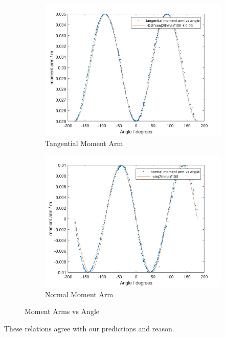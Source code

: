 \documentclass{article}
\begin{document}
\begin{figure}[ht]
  \begin{subfigure}[b]{0.4\linewidth}
    \includegraphics[scale=0.14]{TanMomentArmVsAngle.jpg}
    \caption{ Tangential Moment Arm}
    \label{fig:TanMomentArmVsAngle}
  \end{subfigure}
  \hfill
  \begin{subfigure}[b]{0.4\linewidth}
    \includegraphics[scale=0.14]{NormMomentArmVsAngle.jpg}
    \caption{Normal Moment Arm}
    \label{fig:NormMomentArmVsAngle}
  \end{subfigure}
  \caption{Moment Arms vs Angle}
\end{figure}

\noindent These relations agree with our predictions and reason.
\end{document}
